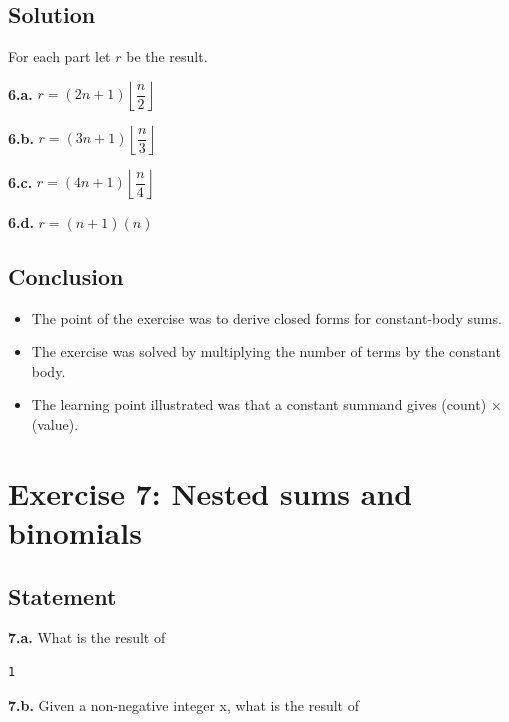 \documentclass[12pt]{article}
\begin{document}

\subsection{Solution}

For each part let $r$ be the result.

\textbf{6.a.} $r = (2n + 1)\left\lfloor \dfrac{n}{2} \right\rfloor$

\textbf{6.b.} $r = (3n + 1)\left\lfloor \dfrac{n}{3} \right\rfloor$

\textbf{6.c.} $r = (4n + 1)\left\lfloor \dfrac{n}{4} \right\rfloor$

\textbf{6.d.} $r = (n + 1)(n)$


\subsection{Conclusion}

\begin{itemize}

\item
  The point of the exercise was to derive closed forms for constant-body sums.

\item
  The exercise was solved by multiplying the number of terms by the constant body.

\item
  The learning point illustrated was that a constant summand gives (count) $\times$ (value).

\end{itemize}


\newpage

\section{Exercise 7: Nested sums and binomials}


\subsection{Statement}

\textbf{7.a.} What is the result of

\begin{verbatim}
1
\end{verbatim}

\textbf{7.b.} Given a non-negative integer x, what is the result of
\end{document}
